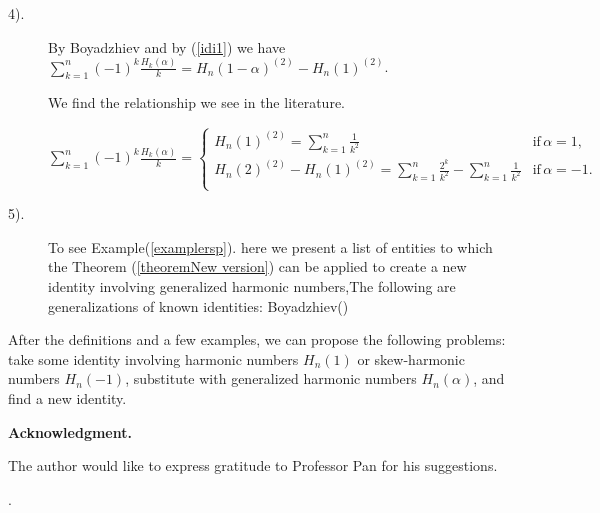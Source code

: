 \documentclass[a4paper,10pt,oneside]{article}
\theoremstyle{definition}
\theoremstyle{remark}
\begin{document}
\begin{description}
 \item[4).]  By Boyadzhiev and by (\ref{idi1}) we have $\sum_{k=1}^n(-1)^k\frac{H_{k}(\alpha)}{k}=H_n(1-\alpha)^{(2)}-H_n(1)^{(2)}$.\par
 We find the relationship we see in the literature.\par
  $\sum_{k=1}^n(-1)^k\frac{H_{k}(\alpha)}{k}=\begin{cases}H_n(1)^{(2)}=\sum_{k=1}^n\frac{1}{k^2}&\text{if}\, \alpha=1,\\
H_n(2)^{(2)}- H_n(1)^{(2)}=\sum_{k=1}^n\frac{2^k}{k^2}-\sum_{k=1}^n\frac{1}{k^2}&\text{if}\, \alpha=- 1.\\ 
  \end{cases}$
  \item[5).] 
  To see Example(\ref{examplersp}). here we present a list of entities to which the Theorem (\ref{theoremNew version}) can be applied to create a new identity involving generalized harmonic numbers,The following are generalizations of known identities: Boyadzhiev(\cite{khristo2})
 

  \end{description}

After the definitions and a few examples, we can propose the following problems: take some identity involving harmonic numbers \( H_n(1) \) or skew-harmonic numbers \( H_n(-1) \), substitute with generalized harmonic numbers \( H_n(\alpha) \), and find a new identity.

 {\bf Acknowledgment.}
 
 The author would like to express gratitude to Professor 
 Pan for his suggestions. 
 

.
\end{document}
